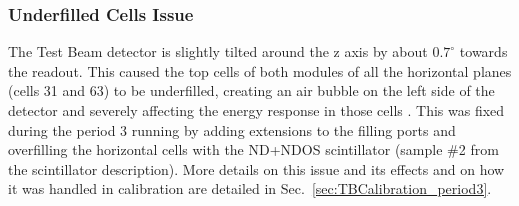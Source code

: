 



\subsubsection*{Underfilled Cells Issue}
The Test Beam detector is slightly tilted around the z axis by about $0.7^{\circ}$ towards the readout. This caused the top cells of both modules of all the horizontal planes (cells 31 and 63) to be underfilled, creating an air bubble on the left side of the detector and severely affecting the energy response in those cells \cite{LackeyThesisNOvATBProtons2022.pdf}. This was fixed \cite{NOvA-doc-49439} during the period 3 running by adding extensions to the filling ports and overfilling the horizontal cells with the \gls{ND}+\gls{NDOS} scintillator (sample \#2 from the scintillator description). More details on this issue and its effects and on how it was handled in calibration are detailed in Sec.~\ref{sec:TBCalibration_period3}.


